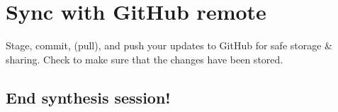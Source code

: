 \documentclass[]{book}
\begin{document}
\hypertarget{sync-with-github-remote}{%
\section{Sync with GitHub remote}\label{sync-with-github-remote}}

Stage, commit, (pull), and push your updates to GitHub for safe storage \& sharing. Check to make sure that the changes have been stored.

\hypertarget{end-synthesis-session}{%
\subsection{End synthesis session!}\label{end-synthesis-session}}


\end{document}
